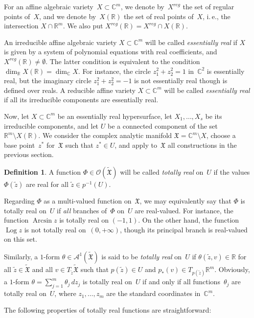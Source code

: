\documentclass[reqno,tbtags,12pt]{amsart}
\numberwithin{equation}{section}
\newcommand{\R}{\mathbb{R}}
\newcommand{\C}{\mathbb{C}}
\newcommand{\FX}{\mathfrak{X}}
\newcommand{\tFX}{\widetilde{\mathfrak{X}}}
\newcommand{\CO}{\mathcal{O}}
\newcommand{\A}{\mathcal{A}}
\newcommand{\tz}{\tilde{z}}
\newcommand{\Arcsin}{\mathop{\mathrm{Arcsin}}\nolimits}
\newcommand{\Log}{\mathop{\mathrm{Log}}\nolimits}
\theoremstyle{definition}
\newtheorem{defin}[theorem]{Definition}
\begin{document}
For an affine algebraic variety~$X\subset\C^m$, we denote by~$X^{reg}$ the set of regular  points of~$X$, and we denote by~$X(\R)$ the set of real points of~$X$, i.\,e., the intersection $X\cap\R^m$. We also put $X^{reg}(\R)=X^{reg}\cap X(\R)$.

An irreducible affine algebraic variety $X\subset\C^m$ will be called \textit{essentially real\/} if $X$ is given by a system of polynomial equations with real coefficients, and $X^{reg}(\R)\ne\emptyset$. The latter condition is equivalent to the condition $\dim_{\R}X(\R)=\dim_{\C}X$. For instance, the circle $z_1^2+z_2^2=1$ in~$\C^2$ is essentially real, but the imaginary circle $z_1^2+z_2^2=-1$ is not essentially real though is defined over reals. A reducible affine variety $X\subset\C^m$ will be called \textit{essentially real\/} if all its irreducible components are essentially real.


Now, let $X\subset\C^m$ be an essentially real hypersurface, let $X_1,\ldots,X_s$ be its irreducible components, and let $U$ be a connected component of the set $\R^m\setminus X(\R)$. We consider the complex analytic manifold $\FX=\C^m\setminus X$, choose a base point~$z^*$ for~$\FX$ such that $z^*\in U$, and apply to~$\FX$ all constructions in the previous section.  

\begin{defin}
A function $\Phi\in\CO(\tFX)$ will be called \textit{totally real\/} on~$U$ if the values $\Phi(\tz)$ are real for all  $\tz\in p^{-1}(U)$. 
\end{defin}

Regarding $\Phi$ as a multi-valued function on~$\FX$, we may equivalently say that $\Phi$ is totally real on~$U$ if \textit{all\/} branches of~$\Phi$ on~$U$ are real-valued. For instance, the function $\Arcsin z$ is totally real on $(-1,1)$. On the other hand, the function $\Log z$ is not totally real on~$(0,+\infty)$, though its principal branch is real-valued on this set.

Similarly, a $1$-form $\theta\in\A^1(\tFX)$ is said to be \textit{totally real\/} on~$U$ if $\theta(\tz,v)\in\R$ for all $\tz\in\tFX$ and all $v\in T_{\tz}\tFX$ such that $p(\tz)\in U$ and $p_*(v)\in T_{p(\tz)}\R^m$. Obviously,  a $1$-form $\theta=\sum_{j=1}^m\theta_j\,dz_j$ is totally real on~$U$ if and only if all functions~$\theta_j$ are totally real on~$U$, where $z_1,\ldots,z_m$ are the standard coordinates in~$\C^m$.

The following properties of totally real functions are straightforward:
\end{document}
